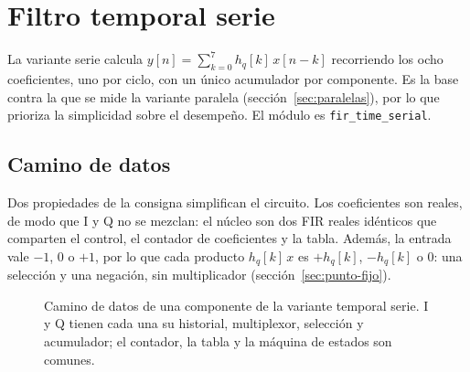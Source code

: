 \section{Filtro temporal serie}\label{sec:tiempo}

La variante serie calcula $y[n] = \sum_{k=0}^{7} h_q[k]\,x[n-k]$ recorriendo los ocho coeficientes, uno por ciclo, con un único acumulador por componente. Es la base contra la que se mide la variante paralela (sección~\ref{sec:paralelas}), por lo que prioriza la simplicidad sobre el desempeño. El módulo es \texttt{fir\_time\_serial}.

\subsection{Camino de datos}

Dos propiedades de la consigna simplifican el circuito. Los coeficientes son reales, de modo que I y Q no se mezclan: el núcleo son dos FIR reales idénticos que comparten el control, el contador de coeficientes y la tabla. Además, la entrada vale $-1$, 0 o $+1$, por lo que cada producto $h_q[k]\,x$ es $+h_q[k]$, $-h_q[k]$ o 0: una selección y una negación, sin multiplicador (sección~\ref{sec:punto-fijo}).

\begin{figure}[h]
  \centering
  \caption{Camino de datos de una componente de la variante temporal serie. I y Q tienen cada una su historial, multiplexor, selección y acumulador; el contador, la tabla y la máquina de estados son comunes.}\label{fig:tiempo-serie}
\end{figure}

